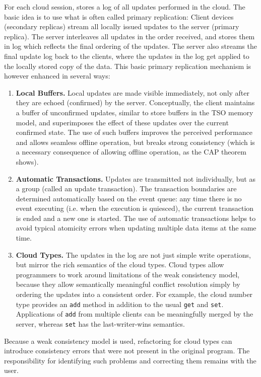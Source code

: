 \documentclass[preprint]{sigplanconf}
\begin{document}
For each cloud session, \TD stores a log of all updates performed in the cloud. The basic idea is to use what is often called primary replication: Client devices (secondary replicas) stream all locally issued updates to the \TD server (primary replica). The server interleaves all updates in the order received, and stores them in log which reflects the final ordering of the updates. The server also streams the final update log back to the clients, where the updates in the log get applied to the locally stored copy of the data. This basic primary replication mechanism is however enhanced in several ways:
\begin{enumerate}
\item \textbf{Local Buffers.}  Local updates are made visible immediately, not only after they are echoed (confirmed) by the server. Conceptually, the client maintains a buffer of unconfirmed updates, similar to store buffers in the TSO memory model, and superimposes the effect of these updates over the current confirmed state. The use of such buffers improves the perceived performance and allows seamless offline operation, but breaks strong consistency (which is a necessary consequence of allowing offline operation, as the CAP theorem \cite{cap-brewer,gilbert-lynch-SIGACT02} shows).
\item \textbf{Automatic Transactions.} Updates are transmitted not individually, but as a group (called an update transaction). The transaction boundaries are determined automatically based on the event queue: any time there is no event executing (i.e. when the execution is quiesced), the current transaction is ended and a new one is started. The use of automatic transactions helps to avoid typical atomicity errors when updating multiple data items at the same time.
\item \textbf{Cloud Types.} The updates in the log are not just simple write operations, but mirror the rich semantics of the cloud types. Cloud types allow programmers to work around limitations of the weak consistency model, because they allow semantically meaningful conflict resolution simply by ordering the updates into a consistent order.
For example, the cloud number type provides an \texttt{add} method in addition to the usual \texttt{get} and \texttt{set}.
Applications of \texttt{add} from multiple clients can be meaningfully merged by the server, whereas \texttt{set} has the last-writer-wins
semantics.
\end{enumerate}

Because a weak consistency model is used, refactoring for cloud types can introduce consistency errors that were not present in the original program. The responsibility for identifying such problems and correcting them remains with the user.
\end{document}
